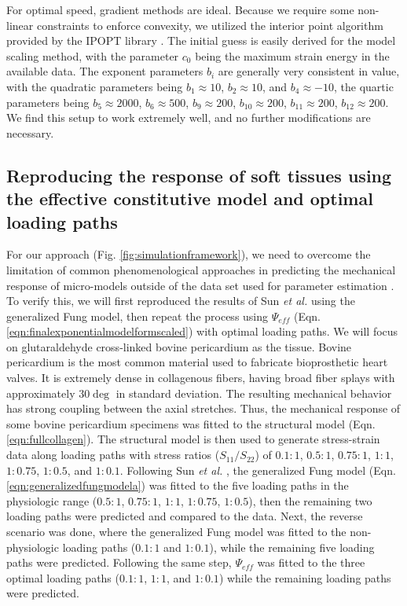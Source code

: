     For optimal speed, gradient methods are ideal. Because we require some non-linear constraints to enforce convexity, we utilized the interior point algorithm provided by the IPOPT library \cite{waechter_implementation_2005}. The initial guess is easily derived for the model scaling method, with the parameter $c_0$ being the maximum strain energy in the available data. The exponent parameters $b_i$ are generally very consistent in value, with the quadratic parameters being $b_1 \approx 10$, $b_2 \approx 10$, and $b_4 \approx -10$, the quartic parameters being $b_5 \approx 2000$, $b_6 \approx 500$, $b_9 \approx 200$, $b_{10} \approx 200$, $b_{11} \approx 200$, $b_{12} \approx 200$. We find this setup to work extremely well, and no further modifications are necessary. 




\subsection{Reproducing the response of soft tissues using the effective constitutive model and optimal loading paths}\label{sec:reproducefung}

    For our approach (Fig. \ref{fig:simulationframework}), we need to overcome the limitation of common phenomenological approaches in predicting the mechanical response of micro-models outside of the data set used for parameter estimation \cite{sun_biaxial_2003}. To verify this, we will first reproduced the results of Sun \textit{et al.} \cite{sun_biaxial_2003} using the generalized Fung model, then repeat the process using $\Psi_{eff}$ (Eqn. \ref{eqn:finalexponentialmodelformscaled}) with optimal loading paths. We will focus on glutaraldehyde cross-linked bovine pericardium as the tissue. Bovine pericardium is the most common material used to fabricate bioprosthetic heart valves. It is extremely dense in collagenous fibers, having broad fiber splays with approximately $30\deg$ in standard deviation. The resulting mechanical behavior has strong coupling between the axial stretches. Thus, the mechanical response of some bovine pericardium specimens was fitted to the structural model (Eqn. \ref{eqn:fullcollagen}). The structural model is then used to generate stress-strain data along loading paths with stress ratios ($S_{11}/S_{22}$) of $0.1:1$, $0.5:1$, $0.75:1$, $1:1$, $1:0.75$, $1:0.5$, and $1:0.1$. Following Sun \textit{et al.} \cite{sun_biaxial_2003}, the generalized Fung model (Eqn. \ref{eqn:generalizedfungmodela}) was fitted to the five loading paths in the physiologic range ($0.5:1$, $0.75:1$, $1:1$, $1:0.75$, $1:0.5$), then the remaining two loading paths were predicted and compared to the data. Next, the reverse scenario was done, where the generalized Fung model was fitted to the non-physiologic loading paths ($0.1:1$ and $1:0.1$), while the remaining five loading paths were predicted. Following the same step, $\Psi_{eff}$ was fitted to the three optimal loading paths ($0.1:1$, $1:1$, and $1:0.1$) while the remaining loading paths were predicted. 
    
